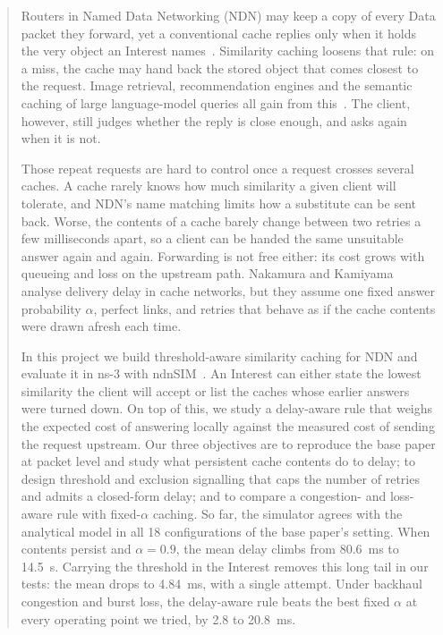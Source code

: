 \documentclass[11pt,a4paper]{article}
\begin{document}
\setcounter{page}{1}
\begin{abstract}
Routers in Named Data Networking (NDN) may keep a copy of every Data packet they forward, yet a
conventional cache replies only when it holds the very object an Interest names~\cite{zhang2014ndn}.
Similarity caching loosens that rule: on a miss, the cache may hand back the stored object that
comes closest to the request. Image retrieval, recommendation engines and the semantic caching of
large language-model queries all gain from this~\cite{neglia2022similarity,schroeder2025vcache}.
The client, however, still judges whether the reply is close enough, and asks again when it is not.

Those repeat requests are hard to control once a request crosses several caches. A cache rarely
knows how much similarity a given client will tolerate, and NDN's name matching limits how a
substitute can be sent back. Worse, the contents of a cache barely change between two retries a few
milliseconds apart, so a client can be handed the same unsuitable answer again and again. Forwarding
is not free either: its cost grows with queueing and loss on the upstream path. Nakamura and
Kamiyama~\cite{nakamura2024analysis} analyse delivery delay in cache networks, but they assume one
fixed answer probability $\alpha$, perfect links, and retries that behave as if the cache contents
were drawn afresh each time.

In this project we build threshold-aware similarity caching for NDN and evaluate it in ns-3 with
ndnSIM~\cite{mastorakis2017ndnsim}. An Interest can either state the lowest similarity the client
will accept or list the caches whose earlier answers were turned down. On top of this, we study a
delay-aware rule that weighs the expected cost of answering locally against the measured cost of
sending the request upstream. Our three objectives are to reproduce the base paper at packet level
and study what persistent cache contents do to delay; to design threshold and exclusion signalling
that caps the number of retries and admits a closed-form delay; and to compare a congestion- and
loss-aware rule with fixed-$\alpha$ caching. So far, the simulator agrees with the analytical model
in all 18 configurations of the base paper's setting. When contents persist and $\alpha=0.9$, the
mean delay climbs from 80.6~ms to 14.5~s. Carrying the threshold in the Interest removes this long
tail in our tests: the mean drops to 4.84~ms, with a single attempt. Under backhaul congestion and
burst loss, the delay-aware rule beats the best fixed $\alpha$ at every operating point we tried, by
2.8 to 20.8~ms.
\end{abstract}
\end{document}
